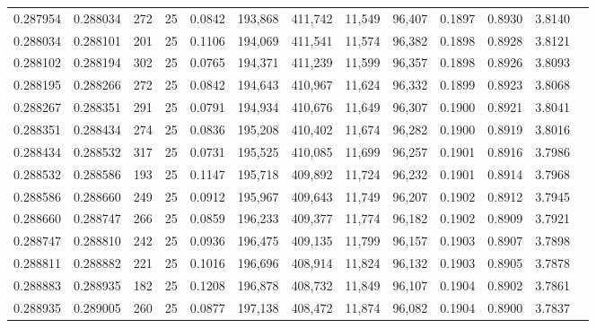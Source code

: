 \begin{tabular}{rrrrrrrrrrrrr}
0.287954 & 0.288034 &   272 &  25 &                                     0.0842 & 193,868 & 411,742 &  11,549 &  96,407 & 0.1897 & 0.8930 & 3.8140 \\
0.288034 & 0.288101 &   201 &  25 &                                     0.1106 & 194,069 & 411,541 &  11,574 &  96,382 & 0.1898 & 0.8928 & 3.8121 \\
0.288102 & 0.288194 &   302 &  25 &                                     0.0765 & 194,371 & 411,239 &  11,599 &  96,357 & 0.1898 & 0.8926 & 3.8093 \\
0.288195 & 0.288266 &   272 &  25 &                                     0.0842 & 194,643 & 410,967 &  11,624 &  96,332 & 0.1899 & 0.8923 & 3.8068 \\
0.288267 & 0.288351 &   291 &  25 &                                     0.0791 & 194,934 & 410,676 &  11,649 &  96,307 & 0.1900 & 0.8921 & 3.8041 \\
0.288351 & 0.288434 &   274 &  25 &                                     0.0836 & 195,208 & 410,402 &  11,674 &  96,282 & 0.1900 & 0.8919 & 3.8016 \\
0.288434 & 0.288532 &   317 &  25 &                                     0.0731 & 195,525 & 410,085 &  11,699 &  96,257 & 0.1901 & 0.8916 & 3.7986 \\
0.288532 & 0.288586 &   193 &  25 &                                     0.1147 & 195,718 & 409,892 &  11,724 &  96,232 & 0.1901 & 0.8914 & 3.7968 \\
0.288586 & 0.288660 &   249 &  25 &                                     0.0912 & 195,967 & 409,643 &  11,749 &  96,207 & 0.1902 & 0.8912 & 3.7945 \\
0.288660 & 0.288747 &   266 &  25 &                                     0.0859 & 196,233 & 409,377 &  11,774 &  96,182 & 0.1902 & 0.8909 & 3.7921 \\
0.288747 & 0.288810 &   242 &  25 &                                     0.0936 & 196,475 & 409,135 &  11,799 &  96,157 & 0.1903 & 0.8907 & 3.7898 \\
0.288811 & 0.288882 &   221 &  25 &                                     0.1016 & 196,696 & 408,914 &  11,824 &  96,132 & 0.1903 & 0.8905 & 3.7878 \\
0.288883 & 0.288935 &   182 &  25 &                                     0.1208 & 196,878 & 408,732 &  11,849 &  96,107 & 0.1904 & 0.8902 & 3.7861 \\
0.288935 & 0.289005 &   260 &  25 &                                     0.0877 & 197,138 & 408,472 &  11,874 &  96,082 & 0.1904 & 0.8900 & 3.7837 \\

\end{tabular}
